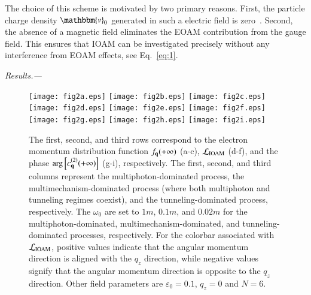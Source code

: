 \documentclass[prl,twocolumn,floatfix,amsmath,nofootinbib,superscriptaddress,amssymb,preprintnumbers,floatfix]{revtex4-1}
\begin{document}
The choice of this scheme is motivated by two primary reasons. First, the particle charge density $\mathbbm{v}_0$ generated in such a electric field is zero~\cite{Amat:2023vwv}. Second, the absence of a magnetic field eliminates the EOAM contribution from the gauge field. This ensures that IOAM can be investigated precisely without any interference from EOAM effects, see Eq.~\eqref{eq:1}.

\emph{Results.---}
\begin{figure*}[!t]\centering
\texttt{[image: fig2a.eps]}
\texttt{[image: fig2b.eps]}
\texttt{[image: fig2c.eps]}
\texttt{[image: fig2d.eps]}
\texttt{[image: fig2e.eps]}
\texttt{[image: fig2f.eps]}
\texttt{[image: fig2g.eps]}
\texttt{[image: fig2h.eps]}
\texttt{[image: fig2i.eps]}
\caption{The first, second, and third rows correspond to the electron momentum distribution function $f_{\bf{q}}(+\infty)$ (a-c), $\mathcal{L}_{\rm IOAM}$ (d-f), and the phase $\arg\left[c_{\bf{q}}^{(2)}(+\infty)\right]$ (g-i), respectively. The first, second, and third columns represent the multiphoton-dominated process, the multimechanism-dominated process (where both multiphoton and tunneling regimes coexist), and the tunneling-dominated process, respectively. The $\omega_{0}$ are set to $1 m$, $0.1 m$, and $0.02 m$ for the multiphoton-dominated, multimechanism-dominated, and tunneling-dominated processes, respectively. For the colorbar associated with $\mathcal{L}_{\rm IOAM}$, positive values indicate that the angular momentum direction is aligned with the $q_z$ direction, while negative values signify that the angular momentum direction is opposite to the $q_z$ direction. Other field parameters are $\varepsilon_{0} = 0.1$, $q_{z}=0$ and $N = 6$.
\label{fig:2}}
\end{figure*}
\end{document}
